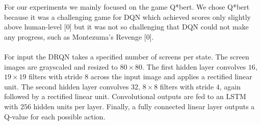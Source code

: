 \documentclass{article}
\begin{document}
For our experiments we mainly focused on the game Q*bert. We chose Q*bert because
it was a challenging game for DQN which achieved scores only slightly above
human-level [0] but it was not so challenging that DQN could not make any progress,
such as Montezuma's Revenge [0]. \\
\\
For input the DRQN takes a specified number of screens per state. The screen images
are grayscaled and resized to $80 \times 80$. The first hidden layer convolves $16$,
$19 \times 19$ filters with stride $8$ across the input image and applies a rectified
linear unit.  The second hidden layer convolves $32$, $8 \times 8$ filters with
stride $4$, again followed by a rectified linear unit.  Convolutional outputs are
fed to an LSTM with $256$ hidden units per layer.  Finally, a fully connected
linear layer outputs a Q-value for each possible action. \\
\end{document}
